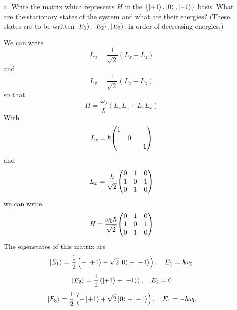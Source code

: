 \documentclass[a4paper,twoside]{article}
\begin{document}
\begin{itemize}
    \item[a.] Write the matrix which represents $ H $ in the $ \{\ket{+1},\ket{0},\ket{-1}\} $ basis. What are the stationary states of the system and what are their energies? (These states are to be written $\ket{E_1},\ket{E_2},\ket{E_3} $, in order of decreasing energies.)
        \begin{problem}
            We can write
            \begin{equation}
                L_u = \frac{1}{\sqrt{2}} (L_x + L_z)
            \end{equation}
            and
            \begin{equation}
                L_v = \frac{1}{\sqrt{2}} (L_x - L_z)
            \end{equation}
            so that
            \begin{equation}
                H = \frac{\omega_0}{\hbar} (L_x L_z + L_z L_x)
            \end{equation}
            With
            \begin{equation}
                L_z = \hbar \mqty(\dmat{1,0,-1})
            \end{equation}
            and
            \begin{equation}
                L_x = \frac{\hbar}{\sqrt{2}} \mqty(0 & 1 & 0 \\ 1 & 0 & 1 \\ 0 & 1 & 0)
            \end{equation}
            we can write
            \begin{equation}
                H = \frac{\omega_0 \hbar}{\sqrt{2}} \mqty(0 & 1 & 0 \\ 1 & 0 & 1 \\ 0 & 1 & 0)
            \end{equation}
            The eigenstates of this matrix are
            \begin{equation}
                \ket{E_1} = \frac{1}{2}\left(-\ket{+1} - \sqrt{2}\ket{0} +\ket{-1} \right) \qc E_1 = \hbar \omega_0
            \end{equation}
            \begin{equation}
                \ket{E_2} = \frac{1}{2} \left(\ket{+1} +\ket{-1} \right) \qc E_2 = 0
            \end{equation}
            \begin{equation}
                \ket{E_3} = \frac{1}{2}\left(-\ket{+1} + \sqrt{2}\ket{0} +\ket{-1} \right) \qc E_1 = -\hbar \omega_0

\end{equation}
\end{problem}
\end{itemize}
\end{document}
